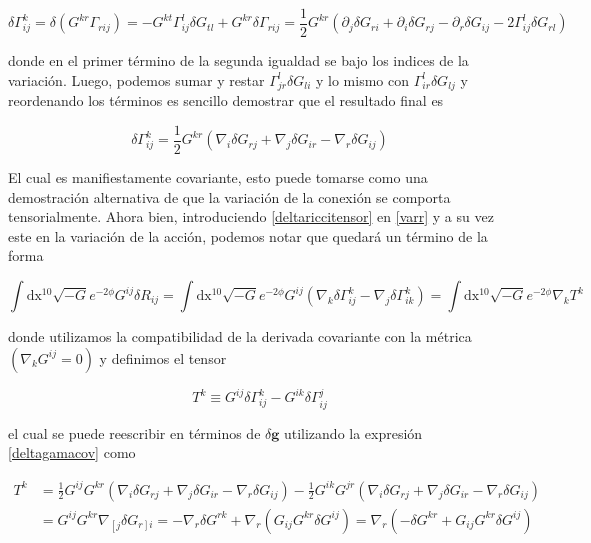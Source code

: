 \documentclass{article}
\numberwithin{equation}{section}
\begin{document}
\begin{equation*}
\delta \Gamma^{k}_{i j} = \delta \left( G^{k r}  \Gamma_{r i j} \right) = - G^{k t} \Gamma^{l}_{ij} \delta G_{t l} + G^{kr}\delta\Gamma_{r i j} = \frac{1}{2} G^{kr}\left( \partial_j \delta G_{r i} + \partial_i \delta G_{r j} - \partial_r \delta G_{i j} - 2\Gamma^{l}_{i j} \delta G_{r l}\right)
\end{equation*}

donde en el primer término de la segunda igualdad se bajo los indices de la variación. Luego, podemos sumar y restar $ \Gamma^{l}_{j r} \delta G_{li} $ y lo mismo con $ \Gamma^{l}_{i r} \delta G_{lj} $ y reordenando los términos es sencillo demostrar que el resultado final es

\begin{equation}\label{deltagamacov}
\delta \Gamma^{k}_{ij} = \frac{1}{2}G^{kr}\left( \nabla_i \delta G_{r j} + \nabla_j \delta G_{i r} - \nabla_r \delta G_{i j}\right)
\end{equation}

El cual es manifiestamente covariante, esto puede tomarse como una demostración alternativa de que la variación de la conexión se comporta tensorialmente. Ahora bien, introduciendo \ref{deltariccitensor} en \ref{varr} y a su vez este en la variación de la acción, podemos notar que quedará un término de la forma

\begin{equation}\label{aux3}
\int\mathrm{dx^{10}} \sqrt{-G}e^{-2\phi} G^{ij}\delta R_{ij} = \int\mathrm{dx^{10}} \sqrt{-G}e^{-2\phi}G^{ij}\left( \nabla_{k} \delta \Gamma^{k}_{i j} - \nabla_{j} \delta \Gamma^{k}_{i k}\right) = \int\mathrm{dx^{10}} \sqrt{-G}e^{-2\phi} \nabla_k T^k 
\end{equation}

donde utilizamos la compatibilidad de la derivada covariante con la métrica $ \left( \nabla_k G^{ij}=0  \right) $ y definimos el tensor 

\begin{equation*}
T^k \equiv G^{ij} \delta \Gamma^k_{i j} -  G^{ik} \delta \Gamma^j_{i j}
\end{equation*}

el cual se puede reescribir en términos de $ \delta\textbf{g} $ utilizando la expresión \ref{deltagamacov} como

\begin{equation*}
\begin{aligned}
T^k  &= \frac{1}{2} G^{ij} G^{k r}\left(\nabla_i \delta G_{r j} + \nabla_j \delta G_{i r} - \nabla_r \delta G_{i j}\right) - \frac{1}{2}G^{ik} G^{j r}\left(\nabla_i \delta G_{r j} + \nabla_j \delta G_{i r} - \nabla_r \delta G_{i j}\right)\\
&= G^{ij} G^{k r} \nabla_{\left[j \right.} \delta G_{\left. r\right] i} = - \nabla_r \delta G^{rk} + \nabla_r \left( G_{ij}G^{k r} \delta G^{ij}\right) =  \nabla_r \left( - \delta G^{kr} + G_{ij}G^{kr} \delta G^{ij}\right)
\end{aligned}
\end{equation*}
\end{document}
